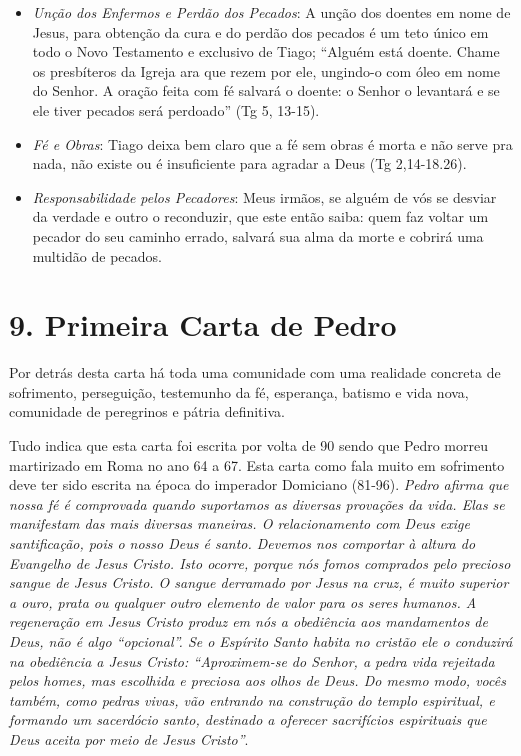 \documentclass[
]{book}
\begin{document}
\begin{itemize}
\item
  \emph{Unção dos Enfermos e Perdão dos Pecados}: A unção dos doentes em nome de Jesus, para obtenção da cura e do perdão dos pecados é um teto único em todo o Novo Testamento e exclusivo de Tiago; ``Alguém está doente. Chame os presbíteros da Igreja ara que rezem por ele, ungindo-o com óleo em nome do Senhor. A oração feita com fé salvará o doente: o Senhor o levantará e se ele tiver pecados será perdoado'' (Tg 5, 13-15).
\item
  \emph{Fé e Obras}: Tiago deixa bem claro que a fé sem obras é morta e não serve pra nada, não existe ou é insuficiente para agradar a Deus (Tg 2,14-18.26).
\item
  \emph{Responsabilidade pelos Pecadores}: Meus irmãos, se alguém de vós se desviar da verdade e outro o reconduzir, que este então saiba: quem faz voltar um pecador do seu caminho errado, salvará sua alma da morte e cobrirá uma multidão de pecados.
\end{itemize}

\hypertarget{primeira-carta-de-pedro}{%
\section*{9. Primeira Carta de Pedro}\label{primeira-carta-de-pedro}}

Por detrás desta carta há toda uma comunidade com uma realidade concreta de sofrimento, perseguição, testemunho da fé, esperança, batismo e vida nova, comunidade de peregrinos e pátria definitiva.

Tudo indica que esta carta foi escrita por volta de 90 sendo que Pedro morreu martirizado em Roma no ano 64 a 67. Esta carta como fala muito em sofrimento deve ter sido escrita na época do imperador Domiciano (81-96). \emph{Pedro afirma que nossa fé é comprovada quando suportamos as diversas provações da vida. Elas se manifestam das mais diversas maneiras. O relacionamento com Deus exige santificação, pois o nosso Deus é santo. Devemos nos comportar à altura do Evangelho de Jesus Cristo. Isto ocorre, porque nós fomos comprados pelo precioso sangue de Jesus Cristo. O sangue derramado por Jesus na cruz, é muito superior a ouro, prata ou qualquer outro elemento de valor para os seres humanos. A regeneração em Jesus Cristo produz em nós a obediência aos mandamentos de Deus, não é algo ``opcional''. Se o Espírito Santo habita no cristão ele o conduzirá na obediência a Jesus Cristo: ``Aproximem-se do Senhor, a pedra vida rejeitada pelos homes, mas escolhida e preciosa aos olhos de Deus. Do mesmo modo, vocês também, como pedras vivas, vão entrando na construção do templo espiritual, e formando um sacerdócio santo, destinado a oferecer sacrifícios espirituais que Deus aceita por meio de Jesus Cristo''}.
\end{document}
